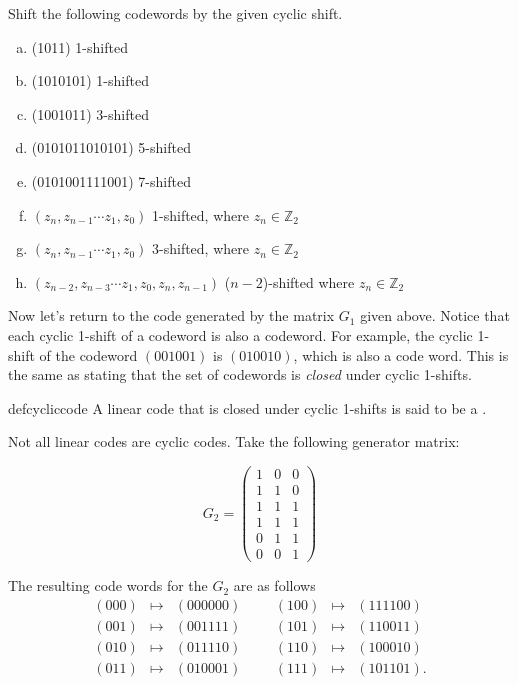 \begin{exercise}{}
Shift the following codewords by the given cyclic shift.
\begin{enumerate}[(a)]
\item (1011)  1-shifted
\item (1010101)  1-shifted
\item (1001011)  3-shifted
\item (0101011010101) 5-shifted
\item (0101001111001)  7-shifted
\item $(z_n, z_{n-1} \cdots z_1,z_0)$  1-shifted, where $z_n \in \mathbb{Z}_2$
\item $(z_n, z_{n-1} \cdots z_1,z_0)$  3-shifted, where $z_n \in \mathbb{Z}_2$
\item $(z_{n-2}, z_{n-3} \cdots z_1, z_0, z_{n},z_{n-1})$ ($n-2$)-shifted where $z_n \in \mathbb{Z}_2$
\end {enumerate}
\end {exercise}

Now let's return to the code generated by the matrix $G_1$ given above. Notice that each cyclic 1-shift of a codeword is also a codeword.  For example, the cyclic 1-shift of the codeword $(001001)$ is $(010010)$, which is also a code word.  This is the same as stating that the set of codewords is \emph{closed} under cyclic 1-shifts.  

\begin{defn}{defcycliccode}
A linear code that is closed under cyclic 1-shifts is said to be a .  
\end {defn}

Not all linear codes are cyclic codes.  Take the following generator matrix: 

\[
G_2 = 
\begin{pmatrix}
1 & 0 & 0 \\
1 & 1 & 0 \\
1 & 1 & 1 \\
1 & 1 & 1 \\
0 & 1 & 1 \\
0 & 0 & 1
\end{pmatrix}
\]

The resulting code words for the $G_2$ are as follows\[
\begin{array}{rclccrcl}
(000) & \mapsto & (000000) & & & (100) & \mapsto & (111100) \\
(001) & \mapsto & (001111) & & & (101) & \mapsto & (110011) \\
(010) & \mapsto & (011110) & & & (110) & \mapsto & (100010) \\
(011) & \mapsto & (010001) & & & (111) & \mapsto & (101101).
\end{array}
\]

